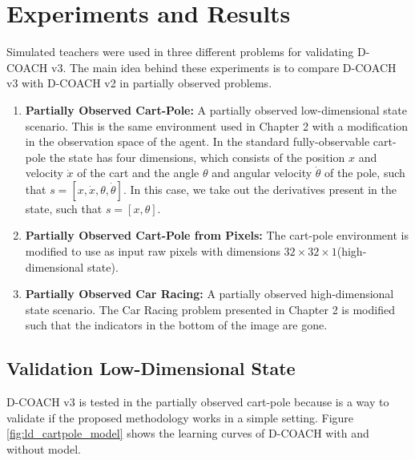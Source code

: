 \section{Experiments and Results}
Simulated teachers were used in three different problems for validating D-COACH v3. The main idea behind these experiments is to compare D-COACH v3 with D-COACH v2 in partially observed problems.

\begin{enumerate}
    \item \textbf{Partially Observed Cart-Pole:} A partially observed low-dimensional state scenario. This is the same environment used in Chapter 2 with a modification in the observation space of the agent. In the standard fully-observable cart-pole the state has four dimensions, which consists of the position $x$ and velocity $\dot x$ of the cart and the angle $\theta$ and angular velocity $\dot \theta$ of the pole, such that $s=[x, \dot x, \theta, \dot \theta]$. In this case, we take out the derivatives present in the state, such that $s=[x, \theta]$.
    \item \textbf{Partially Observed Cart-Pole from Pixels:} The cart-pole environment is modified to use as input raw pixels with dimensions $32\times32\times1$(high-dimensional state). 
    \item \textbf{Partially Observed Car Racing:} A partially observed high-dimensional state scenario. The Car Racing problem presented in Chapter 2 is modified such that the indicators in the bottom of the image are gone. 
    
\end{enumerate}

\subsection{Validation Low-Dimensional State}

D-COACH v3 is tested in the partially observed cart-pole because is a way to validate if the proposed methodology works in a simple setting. Figure \ref{fig:ld_cartpole_model} shows the learning curves of D-COACH with and without model. 

